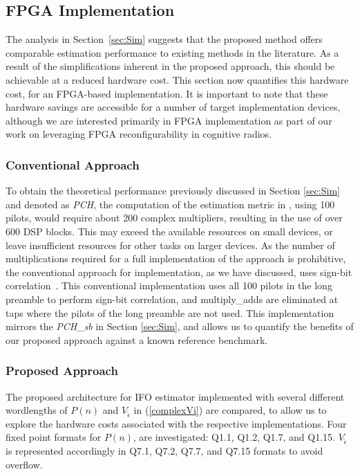 \subsection{FPGA Implementation}
\label{sec:Imple}
The analysis in Section~\ref{sec:Sim} suggests that the proposed method offers comparable estimation performance to existing methods in the literature.
As a result of the simplifications inherent in the proposed approach, this should be achievable at a reduced hardware cost.
This section now quantifies this hardware cost, for an FPGA-based implementation.
It is important to note that these hardware savings are accessible for a number of target implementation devices, although we are interested primarily in FPGA implementation as part of our work on leveraging FPGA reconfigurability in cognitive radios.

\subsubsection{Conventional Approach}
To obtain the theoretical performance previously discussed in Section \ref{sec:Sim} and denoted as \emph{PCH}, the computation of the estimation metric in \cite{Park2002}, using 100 pilots, would require about 200 complex multipliers, resulting in the use of over 600 DSP blocks. This may exceed the available resources on small devices, or leave insufficient resources for other tasks on larger devices.
As the number of multiplications required for a full implementation of the approach is prohibitive, the conventional approach for implementation, as we have discussed, uses sign-bit correlation~\cite{Kim2008}.
This conventional implementation uses all 100 pilots in the long preamble to perform sign-bit correlation, and multiply\_adds are eliminated at taps where the pilots of the long preamble are not used.
This implementation mirrors the \emph{PCH\_sb} in Section \ref{sec:Sim}, and allows us to quantify the benefits of our proposed approach against a known reference benchmark.

\subsubsection{Proposed Approach}

The proposed architecture for IFO estimator implemented with several different wordlengths of $P(n)$ and $V_{\tilde{\epsilon}}$ in (\ref{complexVi}) are compared, to allow us to explore the hardware costs associated with the respective implementations.
Four fixed point formats for $P(n)$, are investigated: Q1.1, Q1.2, Q1.7, and Q1.15.
$V_{\tilde{\epsilon}}$  is represented accordingly in Q7.1, Q7.2, Q7.7, and Q7.15 formats to avoid overflow.

